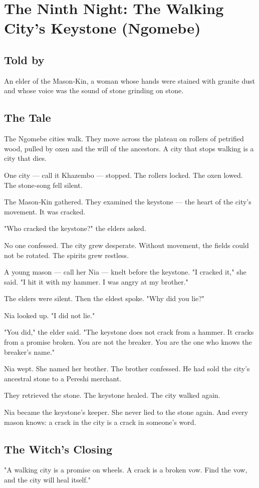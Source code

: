 \documentclass[10pt,twoside]{book}
\begin{document}
\chapter{The Ninth Night: The Walking City's Keystone (Ngomebe)}

\section*{Told by}
An elder of the Mason‑Kin, a woman whose hands were stained with granite dust and whose voice was the sound of stone grinding on stone.

\section*{The Tale}
The Ngomebe cities walk. They move across the plateau on rollers of petrified wood, pulled by oxen and the will of the ancestors. A city that stops walking is a city that dies.

One city --- call it Khazembo --- stopped. The rollers locked. The oxen lowed. The stone‑song fell silent.

The Mason‑Kin gathered. They examined the keystone --- the heart of the city's movement. It was cracked.

"Who cracked the keystone?" the elders asked.

No one confessed. The city grew desperate. Without movement, the fields could not be rotated. The spirits grew restless.

A young mason --- call her Nia --- knelt before the keystone. "I cracked it," she said. "I hit it with my hammer. I was angry at my brother."

The elders were silent. Then the eldest spoke. "Why did you lie?"

Nia looked up. "I did not lie."

"You did," the elder said. "The keystone does not crack from a hammer. It cracks from a promise broken. You are not the breaker. You are the one who knows the breaker's name."

Nia wept. She named her brother. The brother confessed. He had sold the city's ancestral stone to a Pereshi merchant.

They retrieved the stone. The keystone healed. The city walked again.

Nia became the keystone's keeper. She never lied to the stone again. And every mason knows: a crack in the city is a crack in someone's word.

\section*{The Witch's Closing}
"A walking city is a promise on wheels. A crack is a broken vow. Find the vow, and the city will heal itself."
\end{document}
